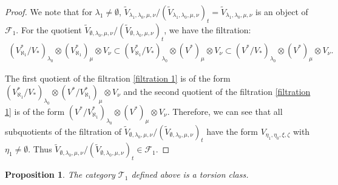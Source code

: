 \documentclass[openany, a4paper]{amsbook}
\newtheorem{prop}[thm]{Proposition}
\theoremstyle{definition}
\numberwithin{equation}{chapter}
\begin{document}
\begin{proof}
    We note that for $\lambda_1 \neq \emptyset$, $\tilde{V}_{\lambda_1, \lambda_0, \mu, \nu}/(\tilde{V}_{\lambda_1, \lambda_0, \mu, \nu})_t = \tilde{V}_{\lambda_1, \lambda_0, \mu, \nu}$ is an object of $\mathcal{F}_1$. For the quotient $\tilde{V}_{\emptyset, \lambda_0, \mu, \nu}/(\tilde{V}_{\emptyset, \lambda_0, \mu, \nu})_t$, we have the filtration:
    \begin{align}\label{filtration 1}
        (V^{\ast}_{\aleph_1}/V_{\ast})_{\lambda_0} \otimes (V^{\ast}_{\aleph_1})_{\mu} \otimes V_{\nu} 
        \subset (V^{\ast}_{\aleph_1}/V_{\ast})_{\lambda_0} \otimes (V^{\ast})_{\mu} \otimes V_{\nu}
        \subset (V^{\ast}/V_{\ast})_{\lambda_0} \otimes (V^{\ast})_{\mu} \otimes V_{\nu}.
    \end{align}

    The first quotient of the filtration \eqref{filtration 1} is of the form $(V^{\ast}_{\aleph_1}/V_{\ast})_{\lambda_0} \otimes (V^{\ast}/V^{\ast}_{\aleph_1})_{\mu} \otimes V_{\nu}$ and the second quotient of the filtration \eqref{filtration 1} is of the form $ (V^{\ast}/V^{\ast}_{\aleph_1})_{\lambda_0} \otimes (V^\ast)_{\mu} \otimes V_{\nu}$. Therefore, we can see that all subquotients of the filtration of $\tilde{V}_{\emptyset, \lambda_0, \mu, \nu}/(\tilde{V}_{\emptyset, \lambda_0, \mu, \nu})_t$ have the form $V_{\eta_1, \eta_0, \xi, \zeta}$ with $\eta_1 \neq \emptyset$. Thus $\tilde{V}_{\emptyset, \lambda_0, \mu, \nu}/(\tilde{V}_{\emptyset, \lambda_0, \mu, \nu})_t \in \mathcal{F}_1$.
\end{proof}

\begin{prop}
    The category $\mathcal{T}_1$ defined above is a torsion class. 
\end{prop}
\end{document}
